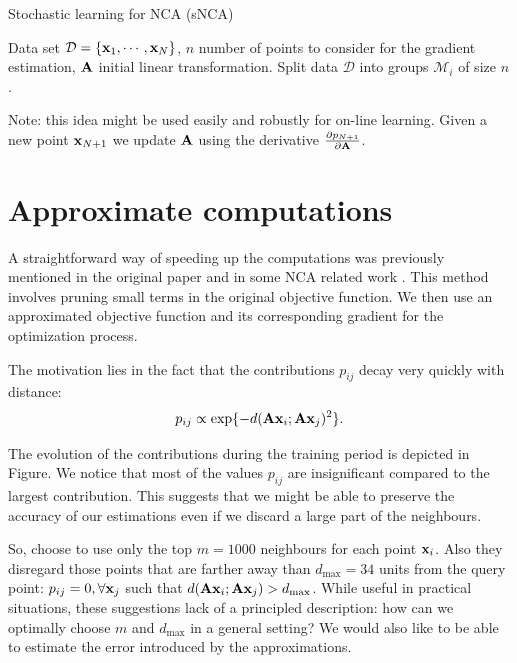 	\begin{algorithm} 
		\caption{Stochastic learning for NCA (sNCA)} 
		\label{alg:sNCA}  
		\begin{algorithmic}                    
			\REQUIRE Data set $\mathcal{D}=\{\mathbf{x}_1,\cdots,\mathbf{x}_N\}$, $n$ number of points to consider for the gradient estimation, $\mathbf{A}$ initial linear transformation.
			\REPEAT
				\STATE Split data $\mathcal{D}$ into groups $\mathcal{M}_i$ of size $n$.\
					\STATE {Update learning rate $\eta$.}
				\ENDFOR
		\end{algorithmic}
	\end{algorithm}

Note: this idea might be used easily and robustly for on-line learning. Given a new point $\mathbf{x}_{N+1}$ we update $\mathbf{A}$ using the derivative $\frac{\partial p_{N+1}}{\partial \mathbf{A}}$.

\section{Approximate computations}
\label{sec:approximate}

A straightforward way of speeding up the computations was previously mentioned in the original paper \citep{goldberger2004} and in some NCA related work \citep{weinberger2007, singh2010}. This method involves pruning small terms in the original objective function. We then use an approximated objective function and its corresponding gradient for the optimization process.

The motivation lies in the fact that the contributions $p_{ij}$ decay very quickly with distance:
 \[
 	p_{ij} \propto \exp\{-d(\mathbf{A}\mathbf{x}_i;\mathbf{A}\mathbf{x}_j)^2\}.
 \] 
 
 The evolution of the contributions during the training period is depicted in Figure.  We notice that most of the values $p_{ij}$ are insignificant compared to the largest contribution. This suggests that we might be able to preserve the accuracy of our estimations even if we discard a large part of the neighbours.

So, \citet{weinberger2007} choose to use only the top $m = 1000$ neighbours for each point $\mathbf{x}_i$. Also they disregard those points that are farther away than $d_{\max}=34$ units from the query point: $p_{ij} = 0, \forall \mathbf{x}_j$ such that $d(\mathbf{A}\mathbf{x}_i;\mathbf{A}\mathbf{x}_j)>d_{\max}$. While useful in practical situations, these suggestions lack of a principled description: how can we optimally choose $m$ and $d_{\max}$ in a general setting? We would also like to be able to estimate the error introduced by the approximations.

